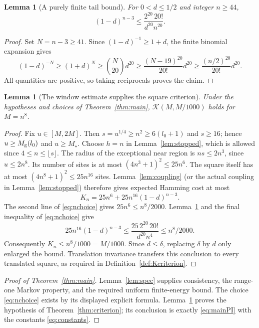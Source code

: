 \documentclass[11pt]{amsart}
\newtheorem{lemma}[theorem]{Lemma}
\theoremstyle{definition}
\newcommand{\1}{\mathbf 1}
\begin{document}
\begin{lemma}[A purely finite tail bound]
\label{lem:tail}
For $0<d\le1/2$ and integer $n\ge44$,
\begin{equation}\label{eq:tail}
 (1-d)^{n-3}\le\frac{2^{20}\,20!}{d^{20}n^{20}}.
\end{equation}
\end{lemma}
\begin{proof}
Set $N=n-3\ge41$. Since $(1-d)^{-1}\ge1+d$, the finite binomial
expansion gives
\[
 (1-d)^{-N}\ge(1+d)^N\ge\binom N{20}d^{20}
 \ge\frac{(N-19)^{20}}{20!}d^{20}
 \ge\frac{(n/2)^{20}}{20!}d^{20}.
\]
All quantities are positive, so taking reciprocals proves the claim.
\end{proof}

\begin{lemma}[The window estimate supplies the square criterion]
\label{lem:windowK}
Under the hypotheses and choices of Theorem~\ref{thm:main},
$\mathcal K(M,M/1000)$ holds for $M=n^8$.
\end{lemma}
\begin{proof}
Fix $u\in[M,2M]$. Then
$s=u^{1/4}\ge n^2\ge6(l_0+1)$ and $s\ge16$; hence
$u\ge M_{\rm g}(l_0)$ and $u\ge M_\star$.
Choose $h=n$ in Lemma~\ref{lem:stopped}, which is allowed since
$4\le n\le\lfloor s\rfloor$. The radius of the exceptional near region
is $ns\le2n^3$, since $u\le2n^8$. Its number of sites is at most
$(4n^3+1)^2\le25n^6$. The square itself has at most
$(4n^8+1)^2\le25n^{16}$ sites. Lemma~\ref{lem:coupling} (or the actual
coupling in Lemma~\ref{lem:stopped}) therefore gives expected Hamming
cost at most
\[
 K_n=25n^6+25n^{16}(1-d)^{n-3}.
\]
The second line of \eqref{eq:nchoice} gives
$25n^6\le n^8/2000$.
Lemma~\ref{lem:tail} and the final inequality of \eqref{eq:nchoice}
give
\[
 25n^{16}(1-d)^{n-3}
 \le\frac{25\,2^{20}\,20!}{d^{20}n^4}
 \le n^8/2000.
\]
Consequently $K_n\le n^8/1000=M/1000$.
Since $d\le\delta$, replacing $\delta$ by $d$ only enlarged the bound.
Translation invariance transfers this conclusion to every translated
square, as required in Definition~\ref{def:Kcriterion}.
\end{proof}

\begin{proof}[Proof of Theorem~\ref{thm:main}]
Lemma~\ref{lem:spec} supplies consistency, the range-one Markov property,
and the required uniform finite-energy bound. The choice
\eqref{eq:nchoice} exists by its displayed explicit formula.
Lemma~\ref{lem:windowK} proves the hypothesis of
Theorem~\ref{thm:criterion}; its conclusion is exactly
\eqref{eq:mainPI} with the constants \eqref{eq:constants}.
\end{proof}
\end{document}

